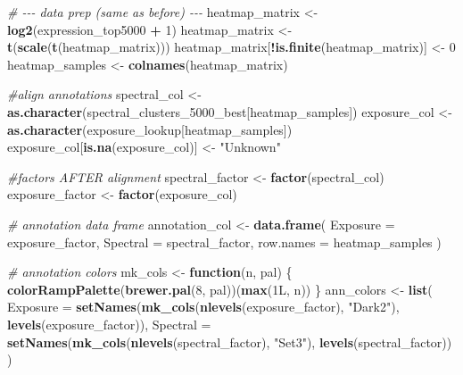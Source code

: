\documentclass[
]{article}
\newenvironment{Shaded}{\begin{snugshade}}{\end{snugshade}}
\newcommand{\AttributeTok}[1]{\textcolor[rgb]{0.13,0.29,0.53}{#1}}
\newcommand{\CommentTok}[1]{\textcolor[rgb]{0.56,0.35,0.01}{\textit{#1}}}
\newcommand{\ControlFlowTok}[1]{\textcolor[rgb]{0.13,0.29,0.53}{\textbf{#1}}}
\newcommand{\DataTypeTok}[1]{\textcolor[rgb]{0.13,0.29,0.53}{#1}}
\newcommand{\DecValTok}[1]{\textcolor[rgb]{0.00,0.00,0.81}{#1}}
\newcommand{\FunctionTok}[1]{\textcolor[rgb]{0.13,0.29,0.53}{\textbf{#1}}}
\newcommand{\NormalTok}[1]{#1}
\newcommand{\OtherTok}[1]{\textcolor[rgb]{0.56,0.35,0.01}{#1}}
\newcommand{\SpecialCharTok}[1]{\textcolor[rgb]{0.81,0.36,0.00}{\textbf{#1}}}
\newcommand{\StringTok}[1]{\textcolor[rgb]{0.31,0.60,0.02}{#1}}
\begin{document}
\begin{Shaded}
\begin{Highlighting}[]
\CommentTok{\# {-}{-}{-} data prep (same as before) {-}{-}{-}}
\NormalTok{heatmap\_matrix }\OtherTok{\textless{}{-}} \FunctionTok{log2}\NormalTok{(expression\_top5000 }\SpecialCharTok{+} \DecValTok{1}\NormalTok{)}
\NormalTok{heatmap\_matrix }\OtherTok{\textless{}{-}} \FunctionTok{t}\NormalTok{(}\FunctionTok{scale}\NormalTok{(}\FunctionTok{t}\NormalTok{(heatmap\_matrix)))}
\NormalTok{heatmap\_matrix[}\SpecialCharTok{!}\FunctionTok{is.finite}\NormalTok{(heatmap\_matrix)] }\OtherTok{\textless{}{-}} \DecValTok{0}
\NormalTok{heatmap\_samples }\OtherTok{\textless{}{-}} \FunctionTok{colnames}\NormalTok{(heatmap\_matrix)}

\CommentTok{\#align annotations}
\NormalTok{spectral\_col }\OtherTok{\textless{}{-}} \FunctionTok{as.character}\NormalTok{(spectral\_clusters\_5000\_best[heatmap\_samples])}
\NormalTok{exposure\_col }\OtherTok{\textless{}{-}} \FunctionTok{as.character}\NormalTok{(exposure\_lookup[heatmap\_samples])}
\NormalTok{exposure\_col[}\FunctionTok{is.na}\NormalTok{(exposure\_col)] }\OtherTok{\textless{}{-}} \StringTok{"Unknown"}

\CommentTok{\#factors AFTER alignment}
\NormalTok{spectral\_factor }\OtherTok{\textless{}{-}} \FunctionTok{factor}\NormalTok{(spectral\_col)}
\NormalTok{exposure\_factor }\OtherTok{\textless{}{-}} \FunctionTok{factor}\NormalTok{(exposure\_col)}

\CommentTok{\# annotation data frame }
\NormalTok{annotation\_col }\OtherTok{\textless{}{-}} \FunctionTok{data.frame}\NormalTok{(}
  \AttributeTok{Exposure =}\NormalTok{ exposure\_factor,}
  \AttributeTok{Spectral =}\NormalTok{ spectral\_factor,}
  \AttributeTok{row.names =}\NormalTok{ heatmap\_samples}
\NormalTok{)}

\CommentTok{\# annotation colors}
\NormalTok{mk\_cols }\OtherTok{\textless{}{-}} \ControlFlowTok{function}\NormalTok{(n, pal) \{}
  \FunctionTok{colorRampPalette}\NormalTok{(}\FunctionTok{brewer.pal}\NormalTok{(}\DecValTok{8}\NormalTok{, pal))(}\FunctionTok{max}\NormalTok{(}\DecValTok{1}\DataTypeTok{L}\NormalTok{, n))}
\NormalTok{\}}
\NormalTok{ann\_colors }\OtherTok{\textless{}{-}} \FunctionTok{list}\NormalTok{(}
  \AttributeTok{Exposure =} \FunctionTok{setNames}\NormalTok{(}\FunctionTok{mk\_cols}\NormalTok{(}\FunctionTok{nlevels}\NormalTok{(exposure\_factor), }\StringTok{"Dark2"}\NormalTok{), }\FunctionTok{levels}\NormalTok{(exposure\_factor)),}
  \AttributeTok{Spectral =} \FunctionTok{setNames}\NormalTok{(}\FunctionTok{mk\_cols}\NormalTok{(}\FunctionTok{nlevels}\NormalTok{(spectral\_factor), }\StringTok{"Set3"}\NormalTok{),  }\FunctionTok{levels}\NormalTok{(spectral\_factor))}
\NormalTok{)}


\end{Highlighting}
\end{Shaded}
\end{document}
